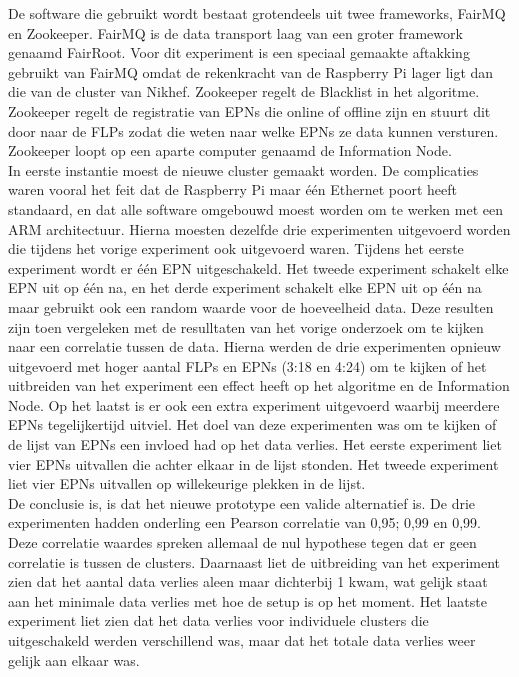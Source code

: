 De software die gebruikt wordt bestaat grotendeels uit twee frameworks, FairMQ en Zookeeper. FairMQ is de data transport laag van een groter framework genaamd FairRoot. Voor dit experiment is een speciaal gemaakte aftakking gebruikt van FairMQ omdat de rekenkracht van de Raspberry Pi lager ligt dan die van de cluster van Nikhef. Zookeeper regelt de Blacklist in het algoritme. Zookeeper regelt de registratie van EPNs die online of offline zijn en stuurt dit door naar de FLPs zodat die weten naar welke EPNs ze data kunnen versturen. Zookeeper loopt op een aparte computer genaamd de Information Node.\\
In eerste instantie moest de nieuwe cluster gemaakt worden. De complicaties waren vooral het feit dat de Raspberry Pi maar één Ethernet poort heeft standaard, en dat alle software omgebouwd moest worden om te werken met een ARM architectuur. Hierna moesten dezelfde drie experimenten uitgevoerd worden die tijdens het vorige experiment ook uitgevoerd waren. Tijdens het eerste experiment wordt er één EPN uitgeschakeld. Het tweede experiment schakelt elke EPN uit op één na, en het derde experiment schakelt elke EPN uit op één na maar gebruikt ook een random waarde voor de hoeveelheid data. Deze resulten zijn toen vergeleken met de resulltaten van het vorige onderzoek om te kijken naar een correlatie tussen de data. Hierna werden de drie experimenten opnieuw uitgevoerd met hoger aantal FLPs en EPNs (3:18 en 4:24) om te kijken of het uitbreiden van het experiment een effect heeft op het algoritme en de Information Node. Op het laatst is er ook een extra experiment uitgevoerd waarbij meerdere EPNs tegelijkertijd uitviel. Het doel van deze experimenten was om te kijken of de lijst van EPNs een invloed had op het data verlies. Het eerste experiment liet vier EPNs uitvallen die achter elkaar in de lijst stonden. Het tweede experiment liet vier EPNs uitvallen op willekeurige plekken in de lijst.\\
De conclusie is, is dat het nieuwe prototype een valide alternatief is. De drie experimenten hadden onderling een Pearson correlatie van 0,95; 0,99 en 0,99. Deze correlatie waardes spreken allemaal de nul hypothese tegen dat er geen correlatie is tussen de clusters. Daarnaast liet de uitbreiding van het experiment zien dat het aantal data verlies aleen maar dichterbij 1 kwam, wat gelijk staat aan het minimale data verlies met hoe de setup is op het moment. Het laatste experiment liet zien dat het data verlies voor individuele clusters die uitgeschakeld werden verschillend was, maar dat het totale data verlies weer gelijk aan elkaar was.\\
